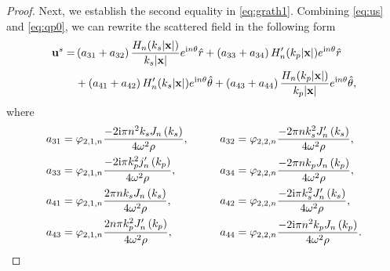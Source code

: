 \documentclass[11pt,reqno,twoside]{amsart}
\theoremstyle{definition}
\theoremstyle{remark}
\numberwithin{equation}{section}
\newcommand{\bu}{\mathbf{u}}
\newcommand{\bx}{\mathbf{x}}
\begin{document}
\begin{proof}
			Next, we establish the second equality in \eqref{eq:grath1}. Combining \eqref{eq:us} and \eqref{eq:qp0}, we can rewrite the scattered field in the following form
				\begin{align}
					\bu^s \notag
					=&\left(a_{31} +a_{32}\right)\frac{H_{n}(k_{s}|\bx|) }{k_{s}|\bx|} e^{\mathrm{i}n\theta }\hat{r}+\left(a_{33} +a_{34}\right)H_{n}'(k_{p}|\bx|)e^{\mathrm{i}n\theta }\hat{r} \notag\\
					&+\left(a_{41}+a_{42}\right)H_{n}'(k_{s}|\bx|)e^{\mathrm{i}n\theta }\hat{\theta}+\left(a_{43}+a_{44}\right)\frac{H_{n}(k_{p}|\bx|) }{k_{p}|\bx|} e^{\mathrm{i}n\theta }\hat{\theta},\notag
				\end{align}
				where
				\begin{align}\label{eq:usxs}
					a_{31} &=\varphi _{2,1,n}\frac{-2\mathrm{i} \pi   n^2 k_{s}  J_n\left(k_{s}  \right)}{4 \omega ^2\rho}, \qquad 
					&a_{32} &=\varphi _{2,2,n}\frac{-2\pi   n k_{s} ^2  J_n'\left(k_{s} \right)}{4 \omega ^2\rho},\\
					a_{33}&=\varphi _{2,1,n}\frac{-2\mathrm{i} \pi   k_{p}^2  j_n'\left(k_{p} \right)}{4 \omega ^2\rho},\qquad 
					&a_{34}&=\varphi _{2,2,n}\frac{-2\pi   n k_{p}   J_n\left(k_{p}\right)}{4 \omega ^2\rho}, \notag \\
					a_{41}&=\varphi _{2,1,n}\frac{2 \pi   n k_{s}  J_n\left(k_{s} \right)}{4 \omega ^2\rho},\qquad
					&a_{42}&=\varphi _{2,2,n}\frac{-2\mathrm{i}\pi    k_{s} ^2  J_n'\left(k_{s} \right)}{4 \omega ^2\rho},\notag\\
					a_{43}&=\varphi _{2,1,n}\frac{2n \pi   k_{p} ^2  J_n'\left(k_{p} \right)}{4 \omega ^2\rho},\qquad
					&a_{44}&=\varphi _{2,2,n}\frac{-2\mathrm{i}\pi   n^2 k_{p}   J_n\left(k_{p} \right)}{4 \omega ^2\rho}.\notag
				\end{align}

\end{proof}
\end{document}
